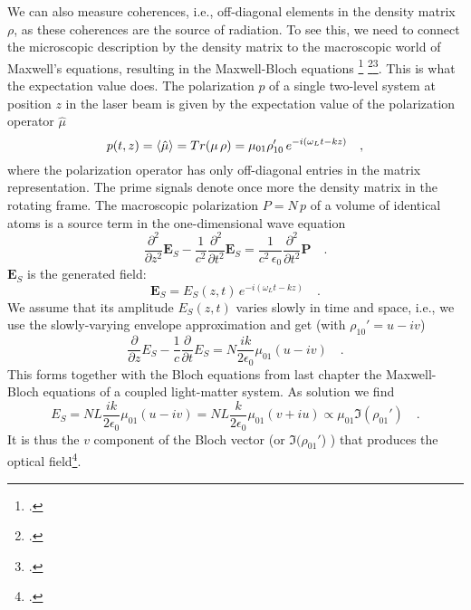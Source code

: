 We can also measure coherences, i.e., off-diagonal elements in the density matrix $\rho$, as these coherences are the source of radiation. To see this, we need to connect the microscopic description by the density matrix to the macroscopic world of Maxwell's equations, resulting in the Maxwell-Bloch equations \footcite[chapter 8.3]{MilonniEberly1988} \footcite[chapter 3.9]{Rand2016}\footcite{Meschede-OLL}. This is what the expectation value does. The  polarization $p$ of a single two-level system at position $z$ in the  laser beam is given by the expectation value of the polarization operator $\hat{\mu}$
\begin{equation}
 p(t,z) = \braket{\hat{\mu}} = Tr ( \mu \, \rho) = \mu_{01} \rho_{10}'  \, e^{-i (\omega_L t - k z)}  \quad ,
\end{equation}
where the polarization operator has only off-diagonal entries in the matrix representation. The prime signals denote once more the density matrix in the rotating frame. The macroscopic polarization $P = N \, p$ of a volume of identical atoms is a source term in the one-dimensional wave equation
\begin{equation}
  \frac{\partial^2}{\partial z^2} \boldsymbol{E}_S  - \frac{1}{c^2} \frac{\partial^2}{\partial t^2} \boldsymbol{E}_S 
 =  
\frac{1}{c^2\, \epsilon_0} \frac{\partial^2}{\partial t^2} \boldsymbol{P}   \quad .
\end{equation}
$ \boldsymbol{E}_S$ is the  generated field:
\begin{equation}
 \boldsymbol{E}_S =   E_S(z,t) \, e^{-i (\omega_L t - k z)}   \quad . \label{eq:fid_def_ES}
\end{equation}
We assume that its amplitude $E_S(z,t) $ varies slowly in time and space, i.e., we use the  slowly-varying envelope approximation and get (with $\rho_{10}' = u - i v$)
\begin{equation}
  \frac{\partial}{\partial z} E_S  - \frac{1}{c} \frac{\partial}{\partial t} E_S
 =  
N \frac{i k }{2 \epsilon_0}  \mu_{01} ( u - i v) \quad .
\end{equation}
This forms together with the Bloch equations from last chapter the Maxwell-Bloch equations of a coupled light-matter system. As solution we find
\begin{equation}
 E_S = N L \frac{i k }{2 \epsilon_0}  \mu_{01} ( u - i v)
 =
  N L \frac{k }{2 \epsilon_0}  \mu_{01} (v + i u)
  \propto \mu_{01} \Im (\rho_{01}' )  \quad .
\end{equation}
It is thus the $v$ component of the Bloch vector (or $\Im (\rho_{01}'$) ) that produces the optical field\footcite[chapter V.B.1]{CT-atom-photon}.
%


